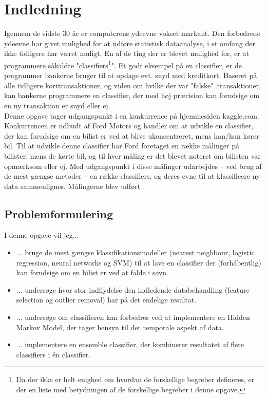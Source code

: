 \section{Indledning}
Igennem de sidste 30 år er computerens ydeevne vokset markant. Den forbedrede ydeevne har givet mulighed for at udføre statistisk dataanalyse, i et omfang der ikke tidligere har været muligt. En af de ting der er blevet mulighed for, er at programmere såkaldte "classifiers\footnote{Da der ikke er helt enighed om hvordan de forskellige begreber defineres, er der en liste med betydningen af de forskellige begreber i denne opgave.}". Et godt eksempel på en classifier, er de programmer bankerne bruger til at opdage evt. snyd med kreditkort. Baseret på alle tidligere korttransaktioner, og viden om hvilke der var "falske"\ transaktioner, kan bankerne programmere en classifier, der med høj præcision kan forudsige om en ny transaktion er snyd eller ej. \\
Denne opgave tager udgangspunkt i en konkurrence på hjemmesiden kaggle.com. Konkurrencen er udbudt af Ford Motors og handler om at udvikle en classifier, der kan forudsige om en bilist er ved at blive ukoncentreret, mens han/hun kører bil. Til at udvikle denne classifier har Ford foretaget en række målinger på bilister, mens de kørte bil, og til hver måling er det blevet noteret om bilisten var opmærksom eller ej. Med udgangspunkt i disse målinger udarbejdes -- ved brug af de mest gængse metoder -- en række classifiers, og deres evne til at klassificere ny data sammenlignes. Målingerne blev udført 

\subsection{Problemformulering}
I denne opgave vil jeg...
\begin{itemize}
    \item ... bruge de mest gængse klassifikationsmodeller (nearest neighbour, logistic regression, neural networks og SVM) til at lave en classifier der (forhåbentlig) kan forudsige om en bilist er ved at falde i søvn.
    \item ... undersøge hvor stor indflydelse den indledende databehandling (feature selection og outlier removal) har på det endelige resultat.
    \item ... undersøge om classifieren kan forbedres ved at implementere en Hidden Markov Model, der tager hensyn til det temporale aspekt af data.
    \item ... implementere en ensemble classifier, der kombinerer resultatet af flere classifiers i én classifier.
\end{itemize}
    